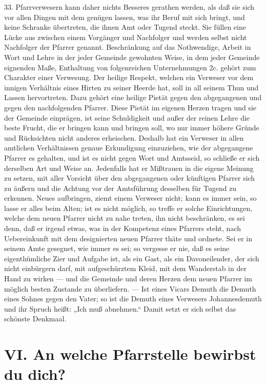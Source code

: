 33. Pfarrverwesern kann daher nichts Besseres gerathen werden, als daß sie sich vor allen Dingen mit dem genügen lassen, was ihr Beruf mit sich bringt, und keine Schranke übertreten, die ihnen Amt oder Tugend steckt. Sie füllen eine Lücke aus zwischen einem Vorgänger und Nachfolger und werden selbst nicht Nachfolger der Pfarrer genannt. Beschränkung auf das Nothwendige, Arbeit in Wort und Lehre in der jeder Gemeinde gewohnten Weise, in dem jeder Gemeinde eignenden Maße, Enthaltung von folgenreichen Unternehmungen 2c. gehört zum Charakter einer Verwesung. Der heilige Respekt, welchen ein Verweser vor dem innigen Verhältnis eines Hirten zu seiner Heerde hat, soll in all seinem Thun und Lassen hervortreten. Dazu gehört eine heilige Pietät gegen den abgegangenen und gegen den nachfolgenden Pfarrer. Diese Pietät im eigenen Herzen tragen und sie der Gemeinde einprägen, ist seine Schuldigkeit und außer der reinen Lehre die beste Frucht, die er bringen kann und bringen soll, wo nur immer höhere Gründe und Rücksichten nicht anderes erheischen. Deshalb hat ein Verweser in allen amtlichen Verhältnissen genaue Erkundigung einzuziehen, wie der abgegangene Pfarrer es gehalten, und ist es nicht gegen Wort und Amtsseid, so schließe er sich derselben Art und Weise an. Jedenfalls hat er Mißtrauen in die eigene Meinung zu setzen, mit aller Vorsicht über den abgegangenen oder künftigen Pfarrer sich zu äußern und die Achtung
vor der Amtsführung desselben für Tugend zu erkennen. Neues aufbringen, ziemt einem Verweser nicht; kann es immer sein, so lasse er alles beim Alten; ist es nicht möglich, so treffe er solche Einrichtungen, welche dem neuen Pfarrer nicht zu nahe treten, ihn nicht beschränken, es sei denn, daß er irgend etwas, was in der Kompetenz eines Pfarrers steht, nach Uebereinkunft mit dem designierten neuen Pfarrer thäte und ordnete. Sei er in seinem Amte gesegnet, wie immer es sei; so vergesse er nie, daß es seine eigenthümliche Zier und Aufgabe ist, als ein Gast, als ein Davoneilender, der sich nicht einbürgern darf, mit aufgeschürztem Kleid, mit dem Wanderstab in der Hand zu wirken — und die Gemeinde und deren Herzen dem neuen Pfarrer im möglich besten Zustande zu überliefern. — Ist eines Vicars Demuth die Demuth eines Sohnes gegen den Vater; so ist die Demuth eines Verwesers Johannesdemuth und ihr Spruch heißt: „Ich muß abnehmen.“ Damit setzt er sich selbst das schönste Denkmaal.

\section[VI. An welche Pfarrstelle]{VI. An welche Pfarrstelle bewirbst du dich?}


